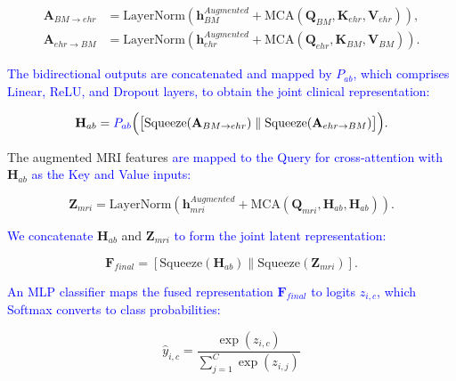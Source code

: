 \documentclass[lettersize,journal]{IEEEtran}
\begin{document}
    \begin{equation}
        \begin{aligned}
        \mathbf{A}_{BM \rightarrow ehr} &= \mathrm{LayerNorm}(\mathbf{h}_{BM}^{Augmented} + \mathrm{MCA}(\mathbf{Q}_{BM}, \mathbf{K}_{ehr}, \mathbf{V}_{ehr})), \\
        \mathbf{A}_{ehr \rightarrow BM} &= \mathrm{LayerNorm}(\mathbf{h}_{ehr}^{Augmented} + \mathrm{MCA}(\mathbf{Q}_{ehr}, \mathbf{K}_{BM}, \mathbf{V}_{BM})).
        \end{aligned}
        \label{eq:bidirectional_mca}
    \end{equation}

    \textcolor{blue}{The bidirectional outputs are concatenated and mapped by $P_{ab}$, which comprises Linear, ReLU, and Dropout layers, to obtain the joint clinical representation:}
    
    \begin{equation}
        \mathbf{H}_{ab} = \textcolor{blue}{P_{ab}}\Big(\big[\mathrm{Squeeze}(\mathbf{A}_{BM \rightarrow ehr}) \parallel \mathrm{Squeeze}(\mathbf{A}_{ehr \rightarrow BM})\big]\Big).
        \label{eq:hab_def}
    \end{equation}


    The augmented MRI features \textcolor{blue}{are mapped to the Query for cross-attention with} $\mathbf{H}_{ab}$ \textcolor{blue}{as the Key and Value inputs:}
    
    \begin{equation}
        \mathbf{Z}_{mri} = \mathrm{LayerNorm}(\mathbf{h}_{mri}^{Augmented} + \mathrm{MCA}(\mathbf{Q}_{mri}, \mathbf{H}_{ab}, \mathbf{H}_{ab})).
        \label{eq:mri_alignment}
    \end{equation}

    \textcolor{blue}{We concatenate} $\mathbf{H}_{ab}$ and $\mathbf{Z}_{mri}$ \textcolor{blue}{to form the joint latent representation:}

    \begin{equation}
    \mathbf{F}_{final} = [ \mathrm{Squeeze}(\mathbf{H}_{ab}) \parallel \mathrm{Squeeze}(\mathbf{Z}_{mri}) ].
    \label{eq:final_fusion}
    \end{equation}

    \textcolor{blue}{An MLP classifier maps the fused representation $\mathbf{F}_{final}$ to logits $z_{i,c}$, which Softmax converts to class probabilities:}
    
    \begin{equation}
        \hat{y}_{i,c} = \frac{\exp(z_{i,c})}{\sum_{j=1}^{C} \exp(z_{i,j})}
        \label{eq:softmax}
    \end{equation}
\end{document}
